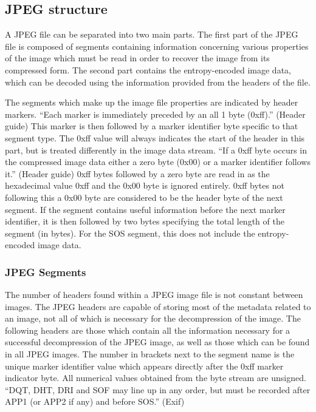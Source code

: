 \documentclass[oneside]{ecsgdp}         %
\begin{document}
\subsection{JPEG structure}
A JPEG file can be separated into two main parts. The first part of the JPEG file is composed of segments containing information concerning various properties of the image which must be read in order to recover the image from its compressed form. The second part contains the entropy-encoded image data, which can be decoded using the information provided from the headers of the file.  

The segments which make up the image file properties are indicated by header markers. ``Each marker is immediately preceded by an all 1 byte (0xff).'' (Header guide) This marker is then followed by a marker identifier byte specific to that segment type. The 0xff value will always indicates the start of the header in this part, but is treated differently in the image data stream. ``If a 0xff byte occurs in the compressed image data either a zero byte (0x00) or a marker identifier follows it.'' (Header guide) 0xff bytes followed by a zero byte are read in as the hexadecimal value 0xff and the 0x00 byte is ignored entirely. 0xff bytes not following this a 0x00 byte are considered to be the header byte of the next segment. If the segment contains useful information before the next marker identifier, it is then followed by two bytes specifying the total length of the segment (in bytes). For the SOS segment, this does not include the entropy-encoded image data.

\subsubsection{JPEG Segments}
The number of headers found within a JPEG image file is not constant between images. The JPEG headers are capable of storing most of the metadata related to an image, not all of which is necessary for the decompression of the image. The following headers are those which contain all the information necessary for a successful decompression of the JPEG image, as well as those which can be found in all JPEG images. The number in brackets next to the segment name is the unique marker identifier value which appears directly after the 0xff marker indicator byte. All numerical values obtained from the byte stream are unsigned. ``DQT, DHT, DRI and SOF may line up in any order, but must be recorded after APP1 (or APP2 if any) and before SOS.'' (Exif)
\end{document}
